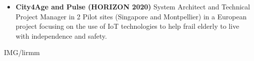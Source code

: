 \documentclass[paper=a4,fontsize=11pt]{temp} %
\begin{document}
\hspace{3mm}
\begin{minipage}{0.04\linewidth}
        \hspace{\linewidth}
		\end{minipage}
   \begin{minipage}{0.86\linewidth}
   	\hspace{2ex}
	 \textbf{\color{subheadings}{Project Management}}  
   \begin{itemize}
  \item \textbf{City4Age and Pulse (HORIZON 2020)} System Architect and Technical Project Manager in 2 Pilot sites (Singapore and Montpellier) in a European project focusing on the use of IoT technologies to help frail elderly to live with independence and safety. 
   \end{itemize}
\end{minipage}

\sepspace

\sepspace


\sepspace

 {IMG/lirmm}
\end{document}
